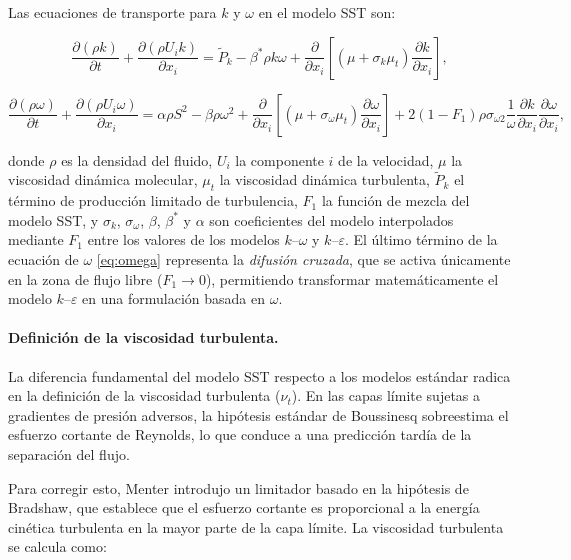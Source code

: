 Las ecuaciones de transporte para $k$ y $\omega$ en el modelo SST son:

\begin{equation}
    \frac{\partial (\rho k)}{\partial t} + \frac{\partial (\rho U_i k)}{\partial x_i} = \tilde{P}_k - \beta^* \rho k \omega + \frac{\partial}{\partial x_i} \left[ (\mu + \sigma_k \mu_t) \frac{\partial k}{\partial x_i} \right],
\end{equation}

\begin{equation}
    \frac{\partial (\rho \omega)}{\partial t} + \frac{\partial (\rho U_i \omega)}{\partial x_i} = \alpha \rho S^2 - \beta \rho \omega^2 + \frac{\partial}{\partial x_i} \left[ (\mu + \sigma_\omega \mu_t) \frac{\partial \omega}{\partial x_i} \right] + 2(1-F_1) \rho \sigma_{\omega 2} \frac{1}{\omega} \frac{\partial k}{\partial x_i} \frac{\partial \omega}{\partial x_i},
    \label{eq:omega}
\end{equation}

donde $\rho$ es la densidad del fluido, $U_i$ la componente $i$ de la
velocidad, $\mu$ la viscosidad dinámica molecular, $\mu_t$ la viscosidad
dinámica turbulenta, $\tilde{P}_k$ el término de producción limitado de
turbulencia, $F_1$ la función de mezcla del modelo SST, y $\sigma_k$,
$\sigma_\omega$, $\beta$, $\beta^*$ y $\alpha$ son coeficientes del modelo
interpolados mediante $F_1$ entre los valores de los modelos
$k$--$\omega$ y $k$--$\varepsilon$.
%
El último término de la ecuación de $\omega$ \eqref{eq:omega} representa la \emph{difusión cruzada}, que se activa únicamente en la zona de flujo libre ($F_1 \to 0$), permitiendo transformar matemáticamente el modelo $k$--$\varepsilon$ en una formulación basada en $\omega$.

\paragraph{Definición de la viscosidad turbulenta.}
La diferencia fundamental del modelo SST respecto a los modelos estándar radica en la definición de la viscosidad turbulenta ($\nu_t$). En las capas límite sujetas a gradientes de presión adversos, la hipótesis estándar de Boussinesq sobreestima el esfuerzo cortante de Reynolds, lo que conduce a una predicción tardía de la separación del flujo.

Para corregir esto, Menter introdujo un limitador basado en la hipótesis de Bradshaw, que establece que el esfuerzo cortante es proporcional a la energía cinética turbulenta en la mayor parte de la capa límite. La viscosidad turbulenta se calcula como:

